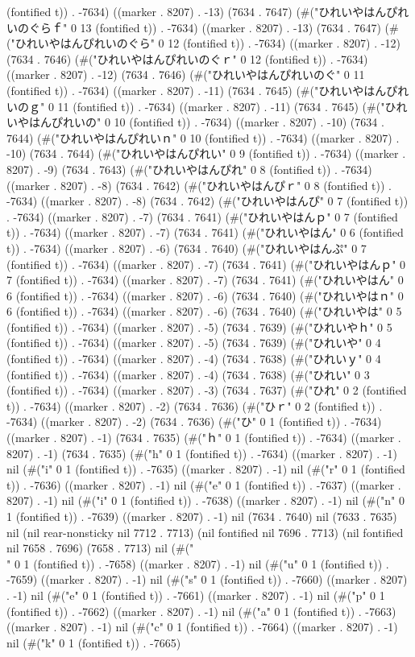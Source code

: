 (fontified t)) . -7634) ((marker . 8207) . -13) (7634 . 7647) (#("ひれいやはんぴれいのぐらｆ" 0 13 (fontified t)) . -7634) ((marker . 8207) . -13) (7634 . 7647) (#("ひれいやはんぴれいのぐら" 0 12 (fontified t)) . -7634) ((marker . 8207) . -12) (7634 . 7646) (#("ひれいやはんぴれいのぐｒ" 0 12 (fontified t)) . -7634) ((marker . 8207) . -12) (7634 . 7646) (#("ひれいやはんぴれいのぐ" 0 11 (fontified t)) . -7634) ((marker . 8207) . -11) (7634 . 7645) (#("ひれいやはんぴれいのｇ" 0 11 (fontified t)) . -7634) ((marker . 8207) . -11) (7634 . 7645) (#("ひれいやはんぴれいの" 0 10 (fontified t)) . -7634) ((marker . 8207) . -10) (7634 . 7644) (#("ひれいやはんぴれいｎ" 0 10 (fontified t)) . -7634) ((marker . 8207) . -10) (7634 . 7644) (#("ひれいやはんぴれい" 0 9 (fontified t)) . -7634) ((marker . 8207) . -9) (7634 . 7643) (#("ひれいやはんぴれ" 0 8 (fontified t)) . -7634) ((marker . 8207) . -8) (7634 . 7642) (#("ひれいやはんぴｒ" 0 8 (fontified t)) . -7634) ((marker . 8207) . -8) (7634 . 7642) (#("ひれいやはんぴ" 0 7 (fontified t)) . -7634) ((marker . 8207) . -7) (7634 . 7641) (#("ひれいやはんｐ" 0 7 (fontified t)) . -7634) ((marker . 8207) . -7) (7634 . 7641) (#("ひれいやはん" 0 6 (fontified t)) . -7634) ((marker . 8207) . -6) (7634 . 7640) (#("ひれいやはんぷ" 0 7 (fontified t)) . -7634) ((marker . 8207) . -7) (7634 . 7641) (#("ひれいやはんｐ" 0 7 (fontified t)) . -7634) ((marker . 8207) . -7) (7634 . 7641) (#("ひれいやはん" 0 6 (fontified t)) . -7634) ((marker . 8207) . -6) (7634 . 7640) (#("ひれいやはｎ" 0 6 (fontified t)) . -7634) ((marker . 8207) . -6) (7634 . 7640) (#("ひれいやは" 0 5 (fontified t)) . -7634) ((marker . 8207) . -5) (7634 . 7639) (#("ひれいやｈ" 0 5 (fontified t)) . -7634) ((marker . 8207) . -5) (7634 . 7639) (#("ひれいや" 0 4 (fontified t)) . -7634) ((marker . 8207) . -4) (7634 . 7638) (#("ひれいｙ" 0 4 (fontified t)) . -7634) ((marker . 8207) . -4) (7634 . 7638) (#("ひれい" 0 3 (fontified t)) . -7634) ((marker . 8207) . -3) (7634 . 7637) (#("ひれ" 0 2 (fontified t)) . -7634) ((marker . 8207) . -2) (7634 . 7636) (#("ひｒ" 0 2 (fontified t)) . -7634) ((marker . 8207) . -2) (7634 . 7636) (#("ひ" 0 1 (fontified t)) . -7634) ((marker . 8207) . -1) (7634 . 7635) (#("ｈ" 0 1 (fontified t)) . -7634) ((marker . 8207) . -1) (7634 . 7635) (#("h" 0 1 (fontified t)) . -7634) ((marker . 8207) . -1) nil (#("i" 0 1 (fontified t)) . -7635) ((marker . 8207) . -1) nil (#("r" 0 1 (fontified t)) . -7636) ((marker . 8207) . -1) nil (#("e" 0 1 (fontified t)) . -7637) ((marker . 8207) . -1) nil (#("i" 0 1 (fontified t)) . -7638) ((marker . 8207) . -1) nil (#("n" 0 1 (fontified t)) . -7639) ((marker . 8207) . -1) nil (7634 . 7640) nil (7633 . 7635) nil (nil rear-nonsticky nil 7712 . 7713) (nil fontified nil 7696 . 7713) (nil fontified nil 7658 . 7696) (7658 . 7713) nil (#("\\" 0 1 (fontified t)) . -7658) ((marker . 8207) . -1) nil (#("u" 0 1 (fontified t)) . -7659) ((marker . 8207) . -1) nil (#("s" 0 1 (fontified t)) . -7660) ((marker . 8207) . -1) nil (#("e" 0 1 (fontified t)) . -7661) ((marker . 8207) . -1) nil (#("p" 0 1 (fontified t)) . -7662) ((marker . 8207) . -1) nil (#("a" 0 1 (fontified t)) . -7663) ((marker . 8207) . -1) nil (#("c" 0 1 (fontified t)) . -7664) ((marker . 8207) . -1) nil (#("k" 0 1 (fontified t)) . -7665) 